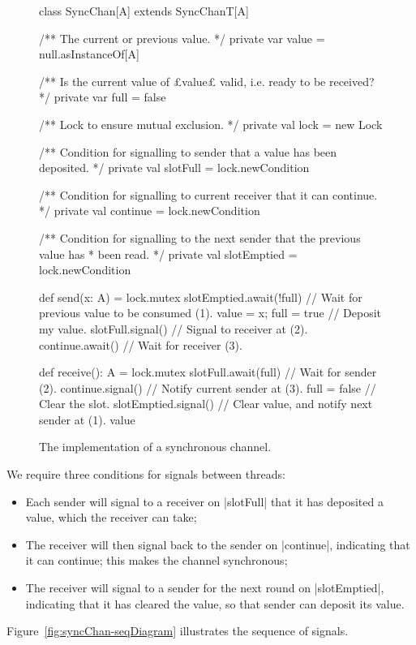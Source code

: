 
\begin{figure}
\begin{scala}
class SyncChan[A] extends SyncChanT[A]{
  /** The current or previous value. */
  private var value = null.asInstanceOf[A]

  /** Is the current value of £value£ valid, i.e. ready to be received? */
  private var full = false

  /** Lock to ensure mutual exclusion. */
  private val lock = new Lock

  /** Condition for signalling to sender that a value has been deposited. */
  private val slotFull = lock.newCondition

  /** Condition for signalling to current receiver that it can continue. */
  private val continue = lock.newCondition

  /** Condition for signalling to the next sender that the previous value has
    * been read. */
  private val slotEmptied = lock.newCondition

  def send(x: A) = lock.mutex{
    slotEmptied.await(!full) // Wait for previous value to be consumed (1).
    value = x; full = true   // Deposit my value.
    slotFull.signal()        // Signal to receiver at (2).
    continue.await()         // Wait for receiver (3).
  }

  def receive(): A = lock.mutex{
    slotFull.await(full)               // Wait for sender (2).
    continue.signal()                  // Notify current sender at (3).
    full = false                       // Clear the slot.
    slotEmptied.signal() // Clear value, and notify next sender at (1).
    value
  }
}
\end{scala}
\caption{The implementation of a synchronous channel.}
\label{fig:SharedSyncChan}
\end{figure}


We require three conditions for signals between threads:
%
\begin{itemize}
\item Each sender will signal to a receiver on |slotFull| that it has
  deposited a value, which the receiver can take;

\item The receiver will then signal back to the sender on |continue|,
  indicating that it can continue; this makes the channel synchronous;

\item The receiver will signal to a sender for the next round on
  |slotEmptied|, indicating that it has cleared the value, so that sender can
  deposit its value.
\end{itemize}
%
Figure~\ref{fig:syncChan-seqDiagram} illustrates the sequence of signals.

